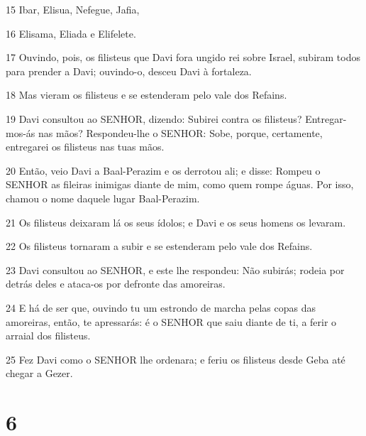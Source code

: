 \par 15 Ibar, Elisua, Nefegue, Jafia,
\par 16 Elisama, Eliada e Elifelete.
\par 17 Ouvindo, pois, os filisteus que Davi fora ungido rei sobre Israel, subiram todos para prender a Davi; ouvindo-o, desceu Davi à fortaleza.
\par 18 Mas vieram os filisteus e se estenderam pelo vale dos Refains.
\par 19 Davi consultou ao SENHOR, dizendo: Subirei contra os filisteus? Entregar-mos-ás nas mãos? Respondeu-lhe o SENHOR: Sobe, porque, certamente, entregarei os filisteus nas tuas mãos.
\par 20 Então, veio Davi a Baal-Perazim e os derrotou ali; e disse: Rompeu o SENHOR as fileiras inimigas diante de mim, como quem rompe águas. Por isso, chamou o nome daquele lugar Baal-Perazim.
\par 21 Os filisteus deixaram lá os seus ídolos; e Davi e os seus homens os levaram.
\par 22 Os filisteus tornaram a subir e se estenderam pelo vale dos Refains.
\par 23 Davi consultou ao SENHOR, e este lhe respondeu: Não subirás; rodeia por detrás deles e ataca-os por defronte das amoreiras.
\par 24 E há de ser que, ouvindo tu um estrondo de marcha pelas copas das amoreiras, então, te apressarás: é o SENHOR que saiu diante de ti, a ferir o arraial dos filisteus.
\par 25 Fez Davi como o SENHOR lhe ordenara; e feriu os filisteus desde Geba até chegar a Gezer.

\chapter{6}

